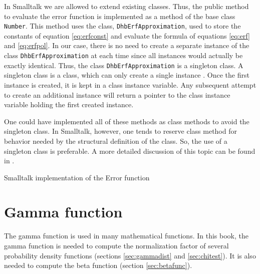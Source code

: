 \documentclass[twoside]{book}
\begin{document}
In Smalltalk we are allowed to extend existing classes. Thus, the
public method to evaluate the error function is implemented as a
method of the base class {\tt Number}. This method uses the class,
{\tt DhbErfApproximation}, used to store the constants of equation
\ref{eq:erfconst} and evaluate the formula of equations
\ref{eq:erf} and \ref{eq:erfpol}. In our case, there is no need to
create a separate instance of the class {\tt DhbErfApproximation}
at each time since all instances would actually be exactly
identical. Thus, the class {\tt DhbErfApproximation} is a
singleton class. A singleton class is a class, which can only
create a single instance \cite{GoF}. Once the first instance is
created, it is kept in a class instance variable. Any subsequent
attempt to create an additional instance will return a pointer to
the class instance variable holding the first created instance.

One could have implemented all of these methods as class methods
to avoid the singleton class. In Smalltalk, however, one tends to
reserve class method for behavior needed by the structural
definition of the class. So, the use of a singleton class is
preferable. A more detailed discussion of this topic can be found
in \cite{StDesPat}.

\begin{listing}
Smalltalk implementation of the Error function
\label{ls:errorFunction}


\end{listing}

\section{Gamma function}
The gamma function is used in many mathematical functions. In this
book, the gamma function is needed to compute the normalization
factor of several probability density functions (\cf sections
\ref{sec:gammadist} and \ref{sec:chitest}). It is also needed to
compute the beta function (\cf section \ref{sec:betafunc}).
\end{document}
